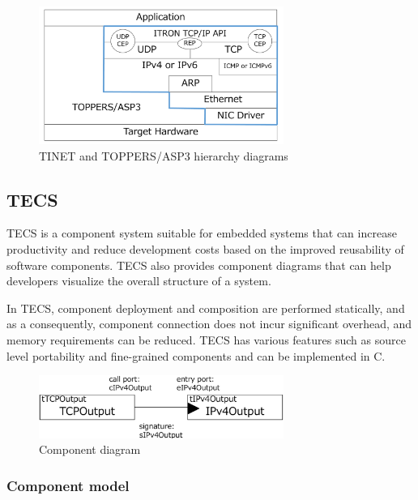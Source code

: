 \documentclass[conference]{IEEEtran/IEEEtran}
\begin{document}
\begin{figure}[t]
    \centering
    \includegraphics[width=8.0cm,clip]{figure/TINETHierarchyDiagram.pdf}
    \vspace{-1mm} \caption{TINET and TOPPERS/ASP3 hierarchy diagrams}
    \vspace{-1mm} \label{fig:TINETHierarchyDiagram}
\end{figure}

\subsection{TECS}
\label{sec:TECS}

TECS is a component system suitable for embedded systems that can increase productivity and reduce development costs based on the improved reusability of software components.
TECS also provides component diagrams that can help developers visualize the overall structure of a system.

In TECS, component deployment and composition are performed statically, and as a consequently, component connection does not incur significant overhead, and memory requirements can be reduced.
TECS has various features such as source level portability and fine-grained components and can be implemented in C.

\begin{figure}[t]
    \centering
    \includegraphics[width=8.0cm,clip]{figure/ComponentDiagram.pdf}
    \vspace{-1mm} \caption{Component diagram}
    \vspace{-1mm} \label{fig:ComponentDiagram}
\end{figure}

\subsubsection{Component model}
\end{document}
